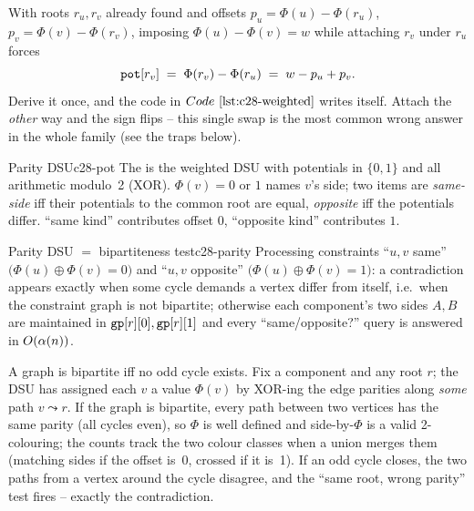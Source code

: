\begin{insightbox}
With roots \(r_u,r_v\) already found and offsets \(p_u=\Phi(u)-\Phi(r_u)\),
\(p_v=\Phi(v)-\Phi(r_v)\), imposing \(\Phi(u)-\Phi(v)=w\) while attaching
\(r_v\) under \(r_u\) forces
\[
  \texttt{pot}[r_v] \;=\; \Phi(r_v)-\Phi(r_u) \;=\; w - p_u + p_v .
\]
Derive it once, and the code in \(\coderef{c28-weighted}\) writes itself.
Attach the \emph{other} way and the sign flips -- this single swap is the
most common wrong answer in the whole family (see the traps below).
\end{insightbox}

\begin{definition}{Parity DSU}{c28-pot}
The  is the weighted DSU with potentials in
\(\{0,1\}\) and all arithmetic modulo~2 (XOR).  \(\Phi(v)=0\) or \(1\) names
\(v\)'s side; two items are \emph{same-side} iff their potentials to the
common root are equal, \emph{opposite} iff the potentials differ.
``same kind'' contributes offset \(0\), ``opposite kind'' contributes \(1\).
\end{definition}

\begin{proposition}{Parity DSU \(=\) bipartiteness test}{c28-parity}
Processing constraints ``\(u,v\) same'' \(\big(\Phi(u)\oplus\Phi(v)=0\big)\)
and ``\(u,v\) opposite'' \(\big(\Phi(u)\oplus\Phi(v)=1\big)\): a contradiction
appears exactly when some cycle demands a vertex differ from itself, i.e.\
when the constraint graph is not bipartite; otherwise each component's two
sides \(A,B\) are maintained in \(\texttt{gp}[r][0],\texttt{gp}[r][1]\) and every
``same/opposite?'' query is answered in \(O(\alpha(n))\).
\end{proposition}
\begin{proofbox}
A graph is bipartite iff no odd cycle exists.  Fix a component and any root
\(r\); the DSU has assigned each \(v\) a value \(\Phi(v)\) by XOR-ing the
edge parities along \emph{some} path \(v\leadsto r\).  If the graph is
bipartite, every path between two vertices has the same parity (all cycles
even), so \(\Phi\) is well defined and side-by-\(\Phi\) is a valid
2-colouring; the \code{gp} counts track the two colour classes when a union
merges them (matching sides if the offset is~0, crossed if it is~1).  If an
odd cycle closes, the two paths from a vertex around the cycle disagree, and
the ``same root, wrong parity'' test fires -- exactly the contradiction.
\end{proofbox}

